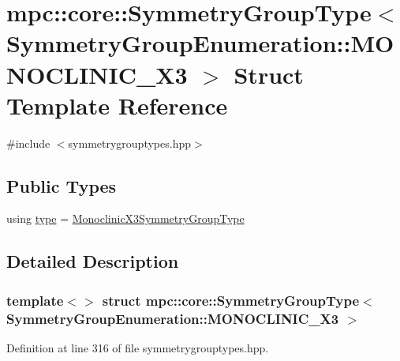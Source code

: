 \hypertarget{structmpc_1_1core_1_1_symmetry_group_type_3_01_symmetry_group_enumeration_1_1_m_o_n_o_c_l_i_n_i_c___x3_01_4}{}\section{mpc\+:\+:core\+:\+:Symmetry\+Group\+Type$<$ Symmetry\+Group\+Enumeration\+:\+:M\+O\+N\+O\+C\+L\+I\+N\+I\+C\+\_\+\+X3 $>$ Struct Template Reference}
\label{structmpc_1_1core_1_1_symmetry_group_type_3_01_symmetry_group_enumeration_1_1_m_o_n_o_c_l_i_n_i_c___x3_01_4}


{\ttfamily \#include $<$symmetrygrouptypes.\+hpp$>$}

\subsection*{Public Types}
\begin{DoxyCompactItemize}
\item 
using \mbox{\hyperlink{structmpc_1_1core_1_1_symmetry_group_type_3_01_symmetry_group_enumeration_1_1_m_o_n_o_c_l_i_n_i_c___x3_01_4_a80413b16e88e14e73bc364495cf50e78}{type}} = \mbox{\hyperlink{structmpc_1_1core_1_1_monoclinic_x3_symmetry_group_type}{Monoclinic\+X3\+Symmetry\+Group\+Type}}
\end{DoxyCompactItemize}


\subsection{Detailed Description}
\subsubsection*{template$<$$>$\newline
struct mpc\+::core\+::\+Symmetry\+Group\+Type$<$ Symmetry\+Group\+Enumeration\+::\+M\+O\+N\+O\+C\+L\+I\+N\+I\+C\+\_\+\+X3 $>$}



Definition at line 316 of file symmetrygrouptypes.\+hpp.



